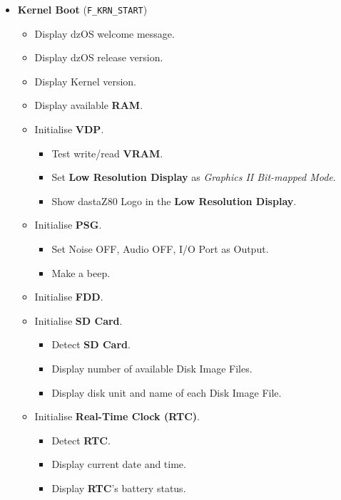 \begin{itemize}
\begin{itemize}
        \end{itemize}
        \item \textbf{Kernel Boot} (\texttt{F\_KRN\_START})
        \begin{itemize}
            \item Display dzOS welcome message.
            \item Display dzOS release version.
            \item Display Kernel version.
            \item Display available \textbf{RAM}.
            \item Initialise \textbf{VDP}.
            \begin{itemize}
                \item Test write/read \textbf{VRAM}.
                \item Set \textbf{Low Resolution Display} as \textit{Graphics II
                Bit-mapped Mode}.
                \item Show dastaZ80 Logo in the \textbf{Low Resolution Display}.
            \end{itemize}
            \item Initialise \textbf{PSG}.
            \begin{itemize}
                \item Set Noise OFF, Audio OFF, I/O Port as Output.
                \item Make a beep.
            \end{itemize}
            \item Initialise \textbf{FDD}.
            \item Initialise \textbf{SD Card}.
            \begin{itemize}
                \item Detect \textbf{SD Card}.
                \item Display number of available Disk Image Files.
                \item Display disk unit and name of each Disk Image File.
            \end{itemize}
            \item Initialise \textbf{Real-Time Clock (RTC)}.
            \begin{itemize}
                \item Detect \textbf{RTC}.
                \item Display current date and time.
                \item Display \textbf{RTC}'s battery status.

\end{itemize}
\end{itemize}
\end{itemize}
